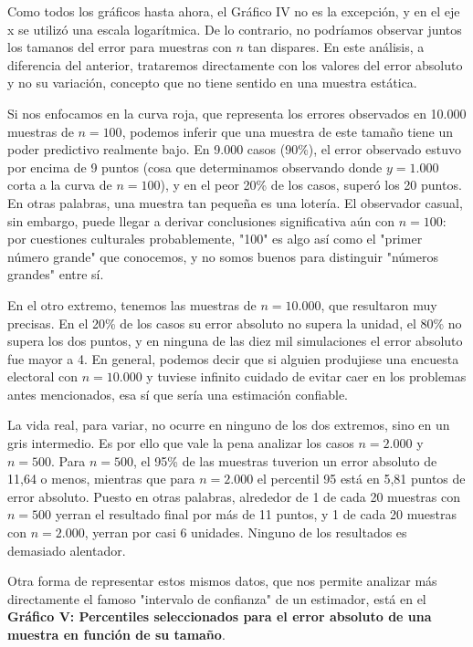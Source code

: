 \documentclass[12pt, a4paper]{article}
\begin{document}
Como todos los gr\'aficos hasta ahora, el Gr\'afico IV no es la excepci\'on, y en el eje x se utiliz\'o una escala logar\'itmica. De lo contrario, no podr\'iamos observar juntos los tamanos del error para muestras con $n$ tan dispares. En este an\'alisis, a diferencia del anterior, trataremos directamente con los valores del error absoluto y no su variaci\'on, concepto que no tiene sentido en una muestra est\'atica.

Si nos enfocamos en la curva roja, que representa los errores observados en 10.000 muestras de $n=100$, podemos inferir que una muestra de este tama\~no tiene un poder predictivo realmente bajo. En 9.000 casos (90\%), el error observado estuvo por encima de 9 puntos (cosa que determinamos observando donde $y=1.000$ corta a la curva de $n=100$), y en el peor 20\% de los casos, super\'o los 20 puntos. En otras palabras, una muestra tan peque\~na es una loter\'ia.
El observador casual, sin embargo, puede llegar a derivar conclusiones significativa a\'un con $n=100$: por cuestiones culturales probablemente, "100" es algo as\'i como el "primer n\'umero grande" que conocemos, y no somos buenos para distinguir "n\'umeros grandes" entre s\'i. 

En el otro extremo, tenemos las muestras de $n=10.000$, que resultaron muy precisas. En el 20\% de los casos su error absoluto no supera la unidad, el 80\% no supera los dos puntos, y en ninguna de las diez mil simulaciones el error absoluto fue mayor a 4. En general, podemos decir que si alguien produjiese una encuesta electoral con $n=10.000$ y tuviese infinito cuidado de evitar caer en los problemas antes mencionados, esa s\'i que ser\'ia una estimaci\'on confiable.

La vida real, para variar, no ocurre en ninguno de los dos extremos, sino en un gris intermedio. Es por ello que vale la pena analizar los casos $n=2.000$ y $n=500$. Para $n=500$, el 95\% de las muestras tuverion un error absoluto de 11,64 o menos, mientras que para $n=2.000$ el percentil 95 est\'a en 5,81 puntos de error absoluto. Puesto en otras palabras, alrededor de 1 de cada 20 muestras con $n=500$ yerran el resultado final por m\'as de 11 puntos, y 1 de cada 20 muestras con $n=2.000$, yerran por casi 6 unidades. Ninguno de los resultados es demasiado alentador.

Otra forma de representar estos mismos datos, que nos permite analizar m\'as directamente el famoso "intervalo de confianza" de un estimador, est\'a en el \textbf{Gr\'afico V: Percentiles seleccionados para el error absoluto de una muestra en funci\'on de su tama\~no}.
\end{document}

